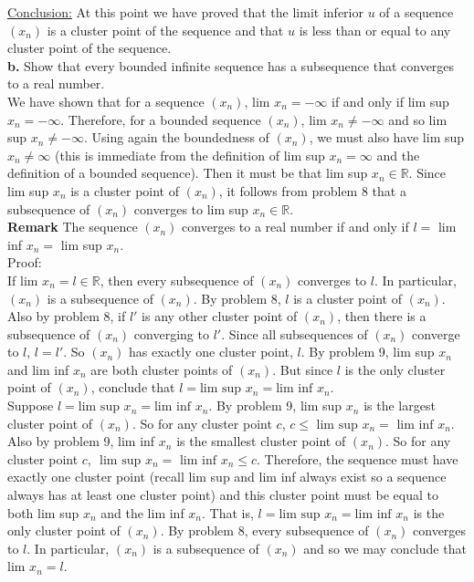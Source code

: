 \documentclass[a4paper]{article}
\begin{document}
\underline{Conclusion:} At this point we have proved that the limit inferior $u$ of a sequence $(x_n)$ is a cluster point of the sequence and that $u$ is less than or equal to any cluster point of the sequence. \\

{\bf b.} Show that every bounded infinite sequence has a subsequence that converges to a real number.\\

We have shown that for a sequence $(x_n)$, lim $x_n = -\infty$ if and only if lim sup $x_n = -\infty$. Therefore, for a bounded sequence $(x_n)$, lim $x_n \neq -\infty$ and so lim sup $x_n \neq -\infty$. Using again the boundedness of $(x_n)$, we must also have lim sup $x_n \neq \infty$ (this is immediate from the definition of lim sup $x_n = \infty$ and the definition of a bounded sequence). Then it must be that lim sup $x_n \in \mathbb{R}$. Since lim sup $x_n$ is a cluster point of $(x_n)$, it follows from problem 8 that a subsequence of $(x_n)$ converges to lim sup $x_n \in \mathbb{R}$.\\

\textbf{Remark} The sequence $(x_n)$ converges to a real number if and only if $l = $ lim inf $x_n = $ lim sup $x_n$. \\

Proof:\\


If lim $x_n = l \in \mathbb{R}$, then every subsequence of $(x_n)$ converges to $l$. In particular, $(x_n)$ is a subsequence of $(x_n)$. By problem 8, $l$ is a cluster point of $(x_n)$. Also by problem 8, if $l'$ is any other cluster point of $(x_n)$, then there is a subsequence of $(x_n)$ converging to $l'$. Since all subsequences of $(x_n)$ converge to $l$, $l = l'$. So $(x_n)$ has exactly one cluster point, $l$. By problem 9, lim sup $x_n$ and lim inf $x_n$ are both cluster points of $(x_n)$. But since $l$ is the only cluster point of $(x_n)$, conclude that $l = \text{lim sup } x_n = \text{lim inf } x_n$. \\

Suppose $l = \text{lim sup } x_n = \text{lim inf } x_n$.  By problem 9, lim sup $x_n$ is the largest cluster point of $(x_n)$. So for any cluster point $c$, $c \leq \text{ lim sup } x_n = \text{ lim inf } x_n$. Also by problem 9, lim inf $x_n$ is the smallest cluster point of $(x_n)$. So for any cluster point $c$, $\text{ lim sup } x_n = \text{ lim inf } x_n \leq c$. Therefore, the sequence must have exactly one cluster point (recall lim sup and lim inf always exist so a sequence always has at least one cluster point) and this cluster point must be equal to both lim sup $x_n$ and the lim inf $x_n$. That is, $l = \text{lim sup } x_n = \text{lim inf } x_n$ is the only cluster point of $(x_n)$. By problem 8, every subsequence of $(x_n)$ converges to $l$. In particular, $(x_n)$ is a subsequence of $(x_n)$ and so we may conclude that lim $x_n = l$. \\
\end{document}
